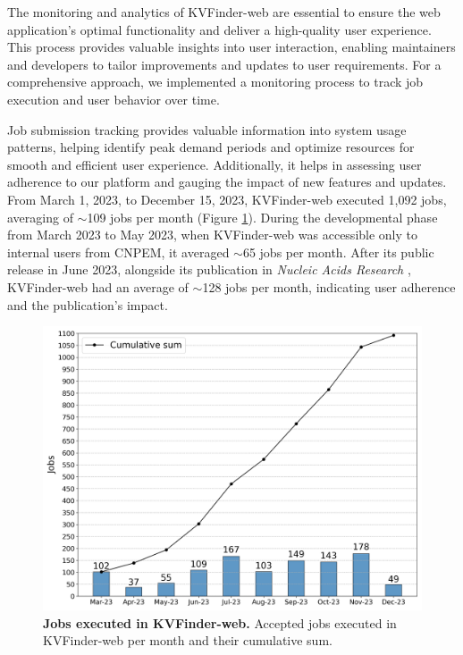 \documentclass[Ingles]{phdthesis}
\begin{document}
The monitoring and analytics of KVFinder-web are essential to ensure the web application's optimal functionality and deliver a high-quality user experience. This process provides valuable insights into user interaction, enabling maintainers and developers to tailor improvements and updates to user requirements. For a comprehensive approach, we implemented a monitoring process to track job execution and user behavior over time. 

Job submission tracking provides valuable information into system usage patterns, helping identify peak demand periods and optimize resources for smooth and efficient user experience. Additionally, it helps in assessing user adherence to our platform and gauging the impact of new features and updates. From March 1, 2023, to December 15, 2023, KVFinder-web executed 1,092 jobs, averaging of $\sim$109 jobs per month (Figure \ref{fig:job-execution}). During the developmental phase from March 2023 to May 2023, when KVFinder-web was accessible only to internal users from CNPEM, it averaged $\sim$65 jobs per month. After its public release in June 2023, alongside its publication in \textit{Nucleic Acids Research} \cite{guerra2023A}, KVFinder-web had an average of $\sim$128 jobs per month, indicating user adherence and the publication's impact.

\begin{figure}[h]
  \centering
  \includegraphics[scale=0.5]{images/jobs-executed-per-month.png}
  \caption[Jobs executed in KVFinder-web]{\textbf{Jobs executed in KVFinder-web.} Accepted jobs executed in KVFinder-web per month and their cumulative sum.}
  \label{fig:job-execution}
\end{figure}
\end{document}
